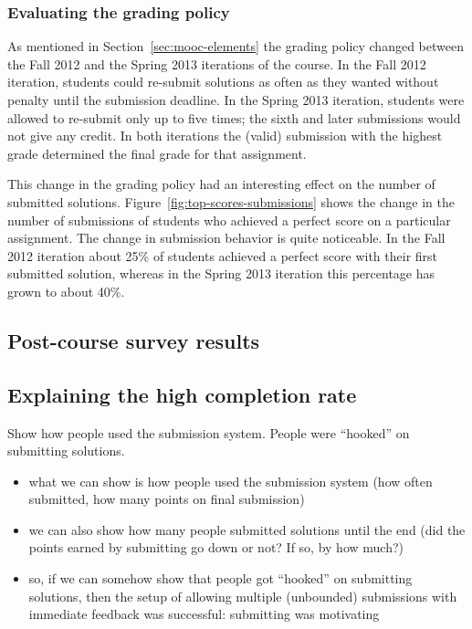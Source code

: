 \documentclass{sig-alternate}
\begin{document}
\subsubsection{Evaluating the grading policy}\label{sec:eval-grading-policy}

As mentioned in Section~\ref{sec:mooc-elements} the grading policy changed
between the Fall 2012 and the Spring 2013 iterations of the course. In the
Fall 2012 iteration, students could re-submit solutions as often as they
wanted without penalty until the submission deadline. In the Spring 2013
iteration, students were allowed to re-submit only up to five times; the sixth
and later submissions would not give any credit. In both iterations the
(valid) submission with the highest grade determined the final grade for that
assignment.

This change in the grading policy had an interesting effect on the number of
submitted solutions. Figure~\ref{fig:top-scores-submissions} shows the change
in the number of submissions of students who achieved a perfect score on a
particular assignment. The change in submission behavior is quite noticeable.
In the Fall 2012 iteration about 25\% of students achieved a perfect score
with their first submitted solution, whereas in the Spring 2013 iteration this
percentage has grown to about 40\%.

\subsection{Post-course survey results}


\subsection{Explaining the high completion rate}

Show how people used the submission system. People were ``hooked'' on submitting solutions.

\begin{itemize}

\item what we can show is how people used the submission system (how often submitted, how
  many points on final submission)

\item we can also show how many people submitted solutions until the end (did the points
  earned by submitting go down or not? If so, by how much?)

\item so, if we can somehow show that people got ``hooked'' on submitting solutions, then
  the setup of allowing multiple (unbounded) submissions with immediate feedback was
  successful: submitting was motivating

\end{itemize}
\end{document}
